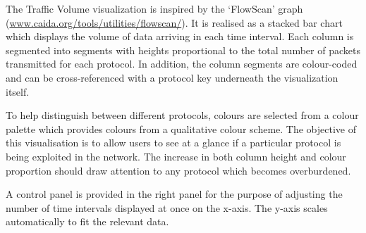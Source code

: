 The Traffic Volume visualization is inspired by the `FlowScan' graph
(\url{www.caida.org/tools/utilities/flowscan/}). It is realised as a stacked
bar chart which displays the volume of data arriving in each time interval.
Each column is segmented into segments with heights proportional to the total
number of packets transmitted for each protocol.
In addition, the column segments are colour-coded and can be cross-referenced
with a protocol key underneath the visualization itself.

To help distinguish between different protocols, colours are selected from a
colour palette which provides colours from a qualitative colour scheme.
The objective of this visualisation is to allow users to see at a glance if a
particular protocol is being exploited in the network. The increase in both
column height and colour proportion should draw attention to any protocol which
becomes overburdened.

A control panel is provided in the right panel for the purpose of adjusting the
number of time intervals displayed at once on the x-axis. The y-axis scales
automatically to fit the relevant data.
